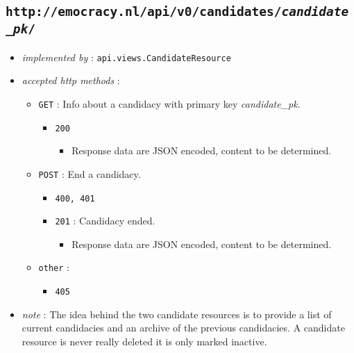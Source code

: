 \documentclass[a4paper]{report}
\begin{document}
\subsection{\texttt{http://emocracy.nl/api/v0/candidates/\emph{candidate\_pk}/}}
\begin{itemize}
    \item{\textsl{implemented by} : \texttt{api.views.CandidateResource}}
    \item{\textsl{accepted http methods} :
        \begin{itemize}
            \item{\texttt{GET} : Info about a candidacy with primary key \emph{candidate\_pk}.
                \begin{itemize}
                    \item{\texttt{200}
                    \begin{itemize}
                        \item{Response data are JSON encoded, content to be determined.}
                    \end{itemize}
                    }
                \end{itemize}
            }
            \item{\texttt{POST} : End a candidacy.
                \begin{itemize}
                    \item{\texttt{400, 401}}
                    \item{\texttt{201} : Candidacy ended.
                        \begin{itemize}
                            \item{Response data are JSON encoded, content to be determined.}
                        \end{itemize}
                      }
                \end{itemize}
            }
            
            \item{\texttt{other} :
                \begin{itemize}
                    \item{\texttt{405}}
                \end{itemize}
            }
        \end{itemize}
    }
    \item{\textsl{note} : 
    The idea behind the two candidate resources is to provide a list of
    current candidacies and an archive of the previous candidacies. A
    candidate resource is never really deleted it is only marked inactive.
    }
    
\end{itemize}
\end{document}
